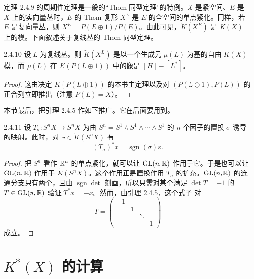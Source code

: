 
定理 2.4.9 的周期性定理是一般的“Thom 同型定理”的特例。$X$ 是紧空间、$E$ 是 $X$ 上的实向量丛时，$E$ 的 Thom 复形 $X^E$ 是 $E$ 的全空间的单点紧化。同样，若 $E$ 是复向量丛，则 $X^E=P(E\oplus1)/P(E)$。由此可见，$\tilde K(X^E)$ 是 $K(X)$ 上的模。下面叙述关于复线丛的 Thom 同型定理。

\begin{theorem*}{2.4.10}
  设 $L$ 为复线丛。则 $\tilde K(X^L)$ 是以一个生成元 $\mu(L)$ 为基的自由 $K(X)$ 模，而 $\mu(L)$ 在 $K(P(L\oplus1))$ 中的像是 $[H]-[L^*]$。
\end{theorem*}

\begin{proof}
  这由决定 $K(P(L\oplus1))$ 的本书主定理以及对 $(P(L\oplus1),P(L))$ 的正合列立即推出（注意 $P(L)=X$）。
\end{proof}

本节最后，把引理 2.4.5 作如下推广。它在后面要用到。

\begin{lemma*}{2.4.11}
  设 $T_\sigma\colon S^nX\to S^nX$ 为由 $S^n=S^1\wedge S^1\wedge\cdots\wedge S^1$ 的 $n$ 个因子的置换 $\sigma$ 诱导的映射。此时，对 $x\in\tilde K(S^nX)$ 有
  \[
  (T_\sigma)^*x=\operatorname{sgn}(\sigma)x.
  \]
\end{lemma*}

\begin{proof}
  把 $S^n$ 看作 $\mathbb{R}^n$ 的单点紧化，就可以让 $\mathrm{GL}(n,\mathbb{R})$ 作用于它。于是也可以让 $\mathrm{GL}(n,\mathbb{R})$ 作用于 $\tilde K(S^nX)$。这个作用正是置换作用 $T_\sigma$ 的扩充。$\mathrm{GL}(n,\mathbb{R})$ 的连通分支只有两个，且由 $\operatorname{sgn}\det$ 刻画，所以只需对某个满足 $\det T=-1$ 的 $T\in\mathrm{GL}(n,\mathbb{R})$ 验证 $T^*x=-x$。然而，由引理 2.4.5，这个式子
  对
  \[
  T=\begin{pmatrix}-1&&&\\&1&&\\&&\ddots&\\&&&1\end{pmatrix}
  \]
  成立。
\end{proof}

\section{$K^*(X)$ 的计算}

